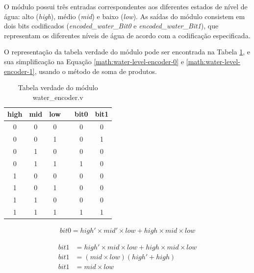 \documentclass[
	article,			%
	11pt,				%
	oneside,			%
	a4paper,			%
	english,			%
	brazil,				%
	sumario=tradicional
	]{abntex2}
\begin{document}
O módulo possui três entradas correspondentes aos diferentes estados de nível de água: alto (\textit{high}), médio (\textit{mid}) e baixo (\textit{low}). As saídas do módulo consistem em dois bits codificados (\textit{encoded\_water\_Bit0} e \textit{encoded\_water\_Bit1}), que representam os diferentes níveis de água de acordo com a codificação especificada.

O representação da tabela verdade do módulo pode ser encontrada na Tabela \ref{tab:water-level-encoder}, e sua simplificação na Equação \eqref{math:water-level-encoder-0} e \eqref{math:water-level-encoder-1}, usando o método de soma de produtos.

\begin{table}[h]
\centering
\begin{tabular}{|c|c|c|c|c|c|}
\hline
high & mid & low &  & bit0 & bit1 \\ \hline
0    & 0   & 0   &  & 0    & 0    \\ \hline
0    & 0   & 1   &  & 0    & 1    \\ \hline
0    & 1   & 0   &  & 0    & 0    \\ \hline
0    & 1   & 1   &  & 1    & 0    \\ \hline
1    & 0   & 0   &  & 0    & 0    \\ \hline
1    & 0   & 1   &  & 0    & 0    \\ \hline
1    & 1   & 0   &  & 0    & 0    \\ \hline
1    & 1   & 1   &  & 1    & 1    \\ \hline
\end{tabular}
\caption{Tabela verdade do módulo water\_encoder.v}
\label{tab:water-level-encoder}
\end{table}


\begin{equation}
\begin{split}
bit0 = high' \times mid' \times low + high \times mid \times low 
\label{math:water-level-encoder-0}
\end{split}
\end{equation}

\begin{equation}
\begin{split}
bit1 &= high' \times mid \times low + high \times mid \times low \\
bit1 &= (mid \times low)(high' + high) \\
bit1 &= mid \times low
\label{math:water-level-encoder-1}
\end{split}
\end{equation}
\end{document}
